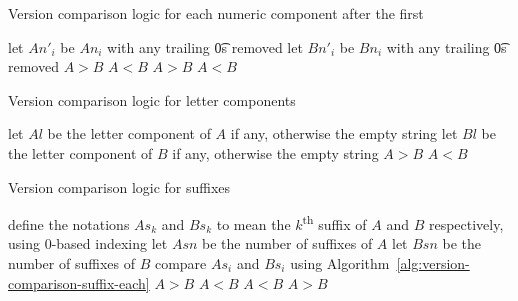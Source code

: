 \begin{algorithm}
\caption{Version comparison logic for each numeric component after the first} \label{alg:version-comparison-numeric-nonfirst}
\begin{algorithmic}[1]
    \STATE let $An'_i$ be $An_i$ with any trailing \t{0}s removed
    \STATE let $Bn'_i$ be $Bn_i$ with any trailing \t{0}s removed
      \RETURN $A>B$
      \RETURN $A<B$
    \ENDIF
  \ELSE
      \RETURN $A>B$
      \RETURN $A<B$
    \ENDIF
  \ENDIF
\end{algorithmic}
\end{algorithm}

\begin{algorithm}
\caption{Version comparison logic for letter components} \label{alg:version-comparison-letter}
\begin{algorithmic}[1]
  \STATE let $Al$ be the letter component of $A$ if any, otherwise the empty string
  \STATE let $Bl$ be the letter component of $B$ if any, otherwise the empty string
    \RETURN $A>B$
    \RETURN $A<B$
  \ENDIF
\end{algorithmic}
\end{algorithm}

\begin{algorithm}
\caption{Version comparison logic for suffixes} \label{alg:version-comparison-suffix}
\begin{algorithmic}[1]
  \STATE define the notations $As_k$ and $Bs_k$ to mean the $k$\textsuperscript{th} suffix of $A$ and $B$ respectively, using $0$-based indexing
  \STATE let $Asn$ be the number of suffixes of $A$
  \STATE let $Bsn$ be the number of suffixes of $B$
    \STATE compare $As_i$ and $Bs_i$ using Algorithm~\ref{alg:version-comparison-suffix-each}
  \ENDFOR
      \RETURN $A>B$
    \ELSE
      \RETURN $A<B$
    \ENDIF
      \RETURN $A<B$
    \ELSE
      \RETURN $A>B$
    \ENDIF
  \ENDIF
\end{algorithmic}
\end{algorithm}

